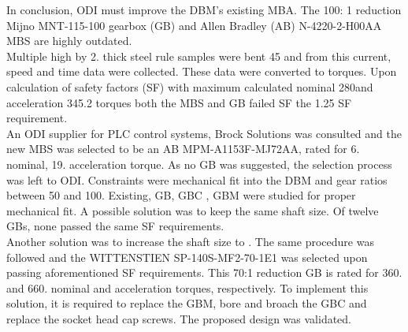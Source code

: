 In conclusion, ODI must improve the DBM’s existing MBA. The 100: 1 reduction Mijno MNT-115-100
gearbox (GB) and Allen Bradley (AB) N-4220-2-H00AA MBS are highly outdated.\\

Multiple  high by 2. thick steel rule samples were bent 45 and from this current, speed and
time data were collected. These data were converted to torques. Upon calculation of safety factors (SF)
with maximum calculated nominal 280and acceleration 345.2  torques both the MBS and GB
failed SF the 1.25 SF requirement.\\

An ODI supplier for PLC control systems, Brock Solutions was consulted and the new MBS was selected
to be an AB MPM-A1153F-MJ72AA, rated for 6. nominal, 19. acceleration torque.
As no GB was suggested, the selection process was left to ODI. Constraints were mechanical fit into the
DBM and gear ratios between 50 and 100. Existing, GB, GBC , GBM were studied for proper mechanical
fit. A possible solution was to keep the same  shaft size. Of twelve GBs, none passed the same SF
requirements.\\

Another solution was to increase the shaft size to . The same procedure was followed and the
WITTENSTIEN SP-140S-MF2-70-1E1 was selected upon passing aforementioned SF requirements. This
70:1 reduction GB is rated for 360. and 660. nominal and acceleration torques, respectively.
To implement this solution, it is required to replace the GBM, bore and broach the GBC and replace the
socket head cap screws. The proposed design was validated.